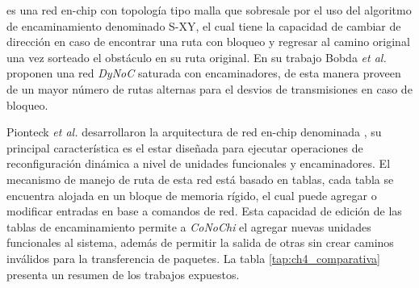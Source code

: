 \cite{chapter3:1515715} es una red en-chip con topología tipo malla que sobresale por el uso del algoritmo de encaminamiento denominado S-XY\cite{chapter3:1511976}, el cual tiene la capacidad de cambiar de dirección en caso de encontrar una ruta con bloqueo y regresar al camino original una vez sorteado el obstáculo en su ruta original. En su trabajo Bobda \textit{et al.} proponen una red \textit{DyNoC} saturada con encaminadores, de esta manera proveen de un mayor número de rutas alternas para el desvios de transmisiones en caso de bloqueo.

Pionteck \textit{et al.}\cite{chapter3:4100970} desarrollaron la arquitectura de red en-chip denominada , su principal característica es el estar diseñada para ejecutar operaciones de reconfiguración dinámica a nivel de unidades funcionales y encaminadores. El mecanismo de manejo de ruta de esta red está basado en tablas, cada tabla se encuentra alojada en un bloque de memoria rígido, el cual puede agregar o modificar entradas en base a comandos de red. Esta capacidad de edición de las tablas de encaminamiento permite a \textit{CoNoChi} el agregar nuevas unidades funcionales al sistema, además de permitir la salida de otras sin crear caminos inválidos para la transferencia de paquetes. La tabla \ref{tap:ch4_comparativa} presenta un resumen de los trabajos expuestos.


